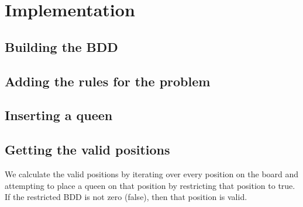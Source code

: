 \section{Implementation}
\label{Implementation}


\subsection{Building the BDD}

\subsection{Adding the rules for the problem}

\subsection{Inserting a queen}

\subsection{Getting the valid positions}
We calculate the valid positions by iterating over every position on the board and attempting to place a queen on that position by restricting that position to true. If the restricted BDD is not zero (false), then that position is valid.